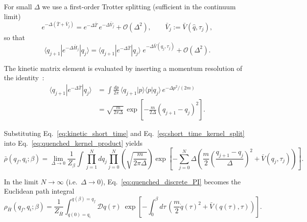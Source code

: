 For small $\Delta$ we use a first-order Trotter splitting (sufficient in the continuum
limit)~\cite{kleinertPathIntegralsQuantum2009}
\begin{equation}
    e^{-\Delta(\bar T+\bar V_j)}
    =
    e^{-\Delta \bar T}\,e^{-\Delta \bar V_j}
    +\mathcal O(\Delta^2),
    \qquad
    \bar V_j:=\bar V(\hat q,\tau_j),
    \label{eq:trotter_split}
\end{equation}
so that
\begin{equation}
    \langle q_{j+1}|e^{-\Delta \bar H_j}|q_j\rangle
    =
    \langle q_{j+1}|e^{-\Delta \bar T}|q_j\rangle\;
    e^{-\Delta \bar V(q_j,\tau_j)}
    +\mathcal O(\Delta^2).
    \label{eq:short_time_kernel_split}
\end{equation}

The kinetic matrix element is evaluated by inserting a momentum resolution of
the identity~\cite{feynmanQuantumMechanicsPath1965,schulmanTechniquesApplicationsPath1981}:
\begin{align}
    \langle q_{j+1}|e^{-\Delta \bar T}|q_j\rangle
    &=
    \int \frac{dp}{2\pi}\,
    \langle q_{j+1}|p\rangle\langle p|q_j\rangle\,e^{-\Delta p^2/(2m)}
    \nonumber\\
    &=
    \sqrt{\frac{m}{2\pi\Delta}}\,
    \exp\!\left[-\frac{m}{2\Delta}(q_{j+1}-q_j)^2\right].
    \label{eq:kinetic_short_time}
\end{align}
\begin{widetext}
Substituting Eq.~\eqref{eq:kinetic_short_time} and Eq.~\eqref{eq:short_time_kernel_split} into
Eq.~\eqref{eq:quenched_kernel_product} yields
\begin{equation}
    \bar\rho(q_f,q_i;\beta)
    =
    \lim_{\Delta\to 0}\frac{1}{Z_\beta}
    \int \prod_{j=1}^{N} dq_j
    \prod_{j=0}^{N}
    \left(\sqrt{\frac{m}{2\pi\Delta}}\right)
    \exp\!\left[
        -\sum_{j=0}^{N}
        \Delta\left(
            \frac{m}{2}\left(\frac{q_{j+1}-q_j}{\Delta}\right)^2
            +\bar V(q_j,\tau_j)
        \right)
    \right].
    \label{eq:quenched_discrete_PI}
\end{equation}

In the limit $N\to\infty$ (i.e.\ $\Delta\to 0$), Eq.~\eqref{eq:quenched_discrete_PI} becomes the
Euclidean path integral~\cite{feynmanQuantumMechanicsPath1965,kleinertPathIntegralsQuantum2009,groscheHandbookFeynmanPath1998}
\begin{equation}
    \rho_{\bar H}(q_f,q_i;\beta)
    =
    \frac{1}{Z_{\bar H}}
    \int_{q(0)=q_i}^{q(\beta)=q_f}\!\!\mathcal D q(\tau)\;
    \exp\!\left[
        -\int_0^\beta d\tau\,
        \left(
            \frac{m}{2}\dot q(\tau)^2+\bar V(q(\tau),\tau)
        \right)
    \right].
    \label{eq:quenched_continuum_PI}
\end{equation}
\end{widetext}
